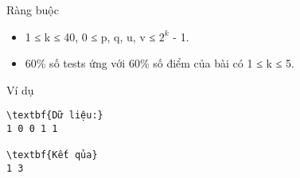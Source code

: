 Ràng buộc
\begin{itemize}
	\item 1 ≤ k ≤ 40, 0 ≤ p, q, u, v ≤ $2^{k}$ - 1.
	\item 60\% số tests ứng với 60\% số điểm của bài có 1 ≤ k ≤ 5.
\end{itemize}
Ví dụ
\begin{verbatim}
\textbf{Dữ liệu:}
1 0 0 1 1

\textbf{Kết qủa}
1 3
\end{verbatim}